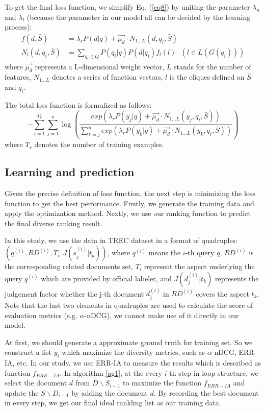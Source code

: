 \documentclass[review]{elsarticle}
\begin{document}
To get the final loss function, we simplify Eq. (\ref{eq8}) by uniting the parameter $\lambda_n$ and $\lambda_l$ (because the parameter in our model all can be decided by the learning process):
\begin{align}
	f(d, \bar{S})&=\lambda_rP(d|q)+\vec{\mu_d}\cdot N_{1...L}(d, q_i, \bar{S})\\
	N_l(d,q_i,\bar{S})&=\sum_{q_i\in Q}P(q_i|q)P(d|q_i)f_l(l)\ \ \ (l\in L(G(q_i)))
\end{align}
where $\vec{\mu_d}$ represents a L-dimensional weight vector, $L$ stands for the number of features, $N_{1...L}$ denotes a series of function vectors, $l$ is the cliques defined on $\bar{S}$ and $q_i$.

The total loss function is formulized as follows:
\begin{equation}
	-\sum_{i=1}^{T_r}\sum_{j=1}^{n}\log(\frac{exp(\lambda_rP(y_j|q)+\vec{\mu_d}\cdot N_{1...L}(y_j,q_i,\bar{S}))}{\sum_{k=j}^{n}exp(\lambda_rP(y_k|q)+\vec{\mu_d}\cdot N_{1...L}(y_k,q_i,\bar{S}))})
\end{equation}
where $T_r$ denotes the number of training examples.

\subsection{Learning and prediction}
Given the precise definition of loss function, the next step is minimizing the loss function to get the best performance. Firstly, we generate the training data and apply the optimization method. Nextly, we use our ranking function to predict the final diverse ranking result.

In this study, we use the data in TREC dataset in a format of quadruples: $(q^{(i)}, RD^{(i)}, T_i, J(s_j^{(i)}|t_k))$, where $q^{(i)}$ means the $i$-th query $q$, $RD^{(i)}$ is the corresponding related documents set, $T_i$ represent the aspect underlying the query $q^{(i)}$ which are provided by official labeler, and $J(d_j^{(i)}|t_k)$ represents the judgement factor whether the j-th document $d_j^{(i)}$ in $RD^{(i)}$ covers the aspect $t_k$. Note that the last two elements in quadruples are used to calculate the score of evaluation metrics (e.g. $\alpha$-nDCG), we cannot make use of it directly in our model.

At first, we should generate a approximate ground truth for training set. So we construct a list $y_i$ which maximize the diversity metrics, such as $\alpha$-nDCG, ERR-IA, etc. In our study, we use ERR-IA to measure the results which is described as function $f_{ERR-IA}$. In algorithm \ref{ag1}, at the every $i$-th step in loop structure, we select the document $d$ from $D\backslash S_{i-1}$ to maximize the function $f_{ERR-IA}$ and update the $S\backslash D_{i-1}$ by adding the document $d$. By recording the best document in every step, we get our final ideal rankling list as our training data.
\end{document}
